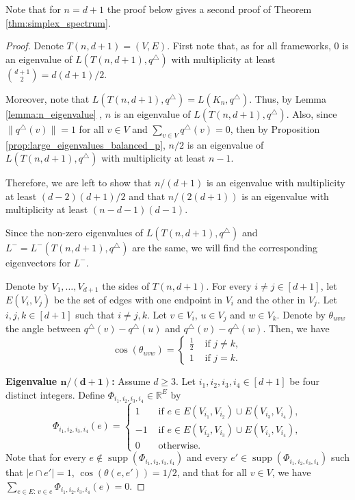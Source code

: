 \documentclass[a4paper,11pt]{article}
\theoremstyle{plain}
\theoremstyle{definition}
\newcommand{\Rea}{{\mathbb R}}
\DeclareMathOperator{\supp}{\text{supp}}
\begin{document}
Note that for $n=d+1$ the proof below gives a second proof of Theorem \ref{thm:simplex_spectrum}.
\begin{proof}

Denote $T(n,d+1)=(V,E)$. First note that, as for all frameworks, $0$ is an eigenvalue of $L(T(n,d+1),q^{\triangle})$ with multiplicity at least $\binom{d+1}{2}=d(d+1)/2$.

Moreover, note that $L(T(n,d+1),q^{\triangle})=L(K_n,q^{\triangle})$. Thus, by Lemma \ref{lemma:n_eigenvalue} , $n$ is an eigenvalue of $L(T(n,d+1),q^{\triangle})$.
Also, since $\|q^{\triangle}(v)\|=1$ for all $v\in V$ and $\sum_{v\in V} q^{\triangle}(v)=0$, then by Proposition \ref{prop:large_eigenvalues_balanced_p}, $n/2$ is an eigenvalue of $L(T(n,d+1),q^{\triangle})$ with multiplicity at least $n-1$.

Therefore, we are left to show that $n/(d+1)$ is an eigenvalue with multiplicity at least $(d-2)(d+1)/2$ and that $n/(2(d+1))$ is an eigenvalue with multiplicity at least $(n-d-1)(d-1)$.

Since the non-zero eigenvalues of $L(T(n,d+1),q^{\triangle})$ and $L^{-}=L^{-}(T(n,d+1),q^{\triangle})$ are the same, we will find the corresponding eigenvectors for $L^{-}$.

Denote by $V_1,\ldots,V_{d+1}$ the sides of $T(n,d+1)$. For every $i\neq j\in[d+1]$, let $E(V_i,V_j)$ be the set of edges with one endpoint in $V_i$ and the other in $V_j$.
Let $i,j,k\in [d+1]$ such that $i\neq j,k$. Let $v\in V_i$, $u\in V_j$ and $w\in V_k$. Denote by $\theta_{uvw}$ the angle between $q^{\triangle}(v)-q^{\triangle}(u)$ and $q^{\triangle}(v)-q^{\triangle}(w)$. Then, we have
\begin{equation}\label{eq:anglesimplex}
    \cos(\theta_{uvw})=\begin{cases}
      \frac{1}{2} & \text{ if } j\neq k,\\  
      1 & \text{ if } j=k.
    \end{cases}
\end{equation}

\textbf{Eigenvalue $\bm{n/(d+1)}$:}  Assume $d\geq 3$. Let $i_1,i_2,i_3,i_4\in[d+1]$ be four distinct integers. 
Define $ \Phi_{i_1,i_2,i_3,i_4}\in \Rea^{E}$ by
\[
 \Phi_{i_1,i_2,i_3,i_4}(e)=\begin{cases}
     1 & \text{ if } e\in E(V_{i_1},V_{i_2})\cup E(V_{i_3},V_{i_4}),\\
     -1 & \text{ if } e\in E(V_{i_2},V_{i_3})\cup E(V_{i_1},V_{i_4}),\\
     0 & \text{ otherwise.}
 \end{cases}
\]
Note that for every $e\notin \supp(\Phi_{i_1,i_2,i_3,i_4})$ and every $e'\in \supp(\Phi_{i_1,i_2,i_3,i_4})$ such that $|e\cap e'|=1$, $\cos(\theta(e,e'))=1/2$, and that for all $v\in V$, we have $\sum_{e\in E:\, v\in e} \Phi_{i_1,i_2,i_3,i_4}(e)=0$.


\end{proof}
\end{document}
